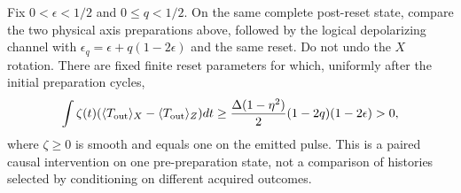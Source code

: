 \begin{corollary}
\label{cor:ring-source}
Fix $0<\epsilon<1/2$ and $0\le q<1/2$. On the same complete
post-reset state, compare the two physical axis preparations above,
followed by the logical depolarizing channel with
$\epsilon_q=\epsilon+q(1-2\epsilon)$ and the same reset. Do not undo
the $X$ rotation. There are fixed finite reset parameters for which,
uniformly after the initial preparation cycles,
\begin{equation}
 \int\zeta(t)(\langle T_{\rm out}\rangle_X-
                    \langle T_{\rm out}\rangle_Z)dt
 \ge\frac{\Delta(1-\eta^2)}2(1-2q)(1-2\epsilon)>0,
 \label{eq:ring-source-contrast}
\end{equation}
where $\zeta\ge0$ is smooth and equals one on the emitted pulse.
This is a paired causal intervention on one pre-preparation state,
not a comparison of histories selected by conditioning on different
acquired outcomes.
\end{corollary}

